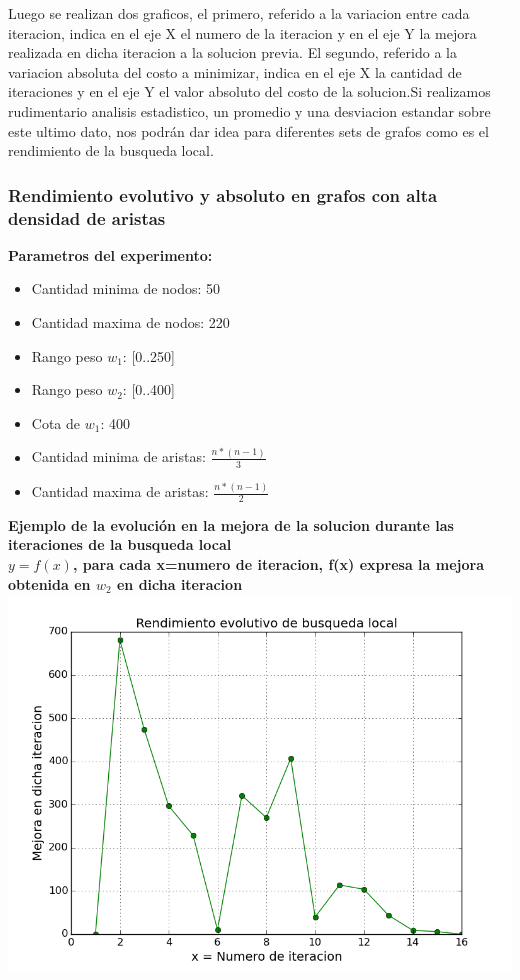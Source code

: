Luego se realizan dos graficos, el primero, referido a la variacion entre cada iteracion, indica en el eje X el numero de la iteracion y en el eje Y la mejora realizada en dicha iteracion a la solucion previa. El segundo, referido a la variacion absoluta del costo a minimizar, indica en el eje X la cantidad de iteraciones y en el eje Y el valor absoluto del costo de la solucion.Si realizamos rudimentario analisis estadistico, un promedio y una desviacion estandar sobre este ultimo dato, nos podr\'an dar idea para diferentes sets de grafos como es el rendimiento de la busqueda local.

\subsubsection{Rendimiento evolutivo y absoluto en grafos con alta densidad de aristas}

\textbf{Parametros del experimento:}
\begin{itemize}
	\item Cantidad minima de nodos: 50
	\item Cantidad maxima de nodos: 220
	\item Rango peso $w_1$: [0..250]
	\item Rango peso $w_2$: [0..400]
	\item Cota de $w_1$: 400
	\item Cantidad minima de aristas: $\frac{n * (n-1)}{3}$
	\item Cantidad maxima de aristas: $\frac{n * (n-1)}{2}$
\end{itemize}  

\vspace{1cm}

\begin{center}
	\textbf{Ejemplo de la evoluci\'on en la mejora de la solucion durante las iteraciones de la busqueda local}\\
	\textbf{$y = f(x)$, para cada x=numero de iteracion, f(x) expresa la mejora obtenida en $w_2$ en dicha iteracion}\\
	\includegraphics[scale=0.7]{experimentos/bqlocal/rendimiento_evolutivo_absoluto_cliques/bqlocal/instancia_190_11970_in_iters_w2_differential.png}
\end{center}

